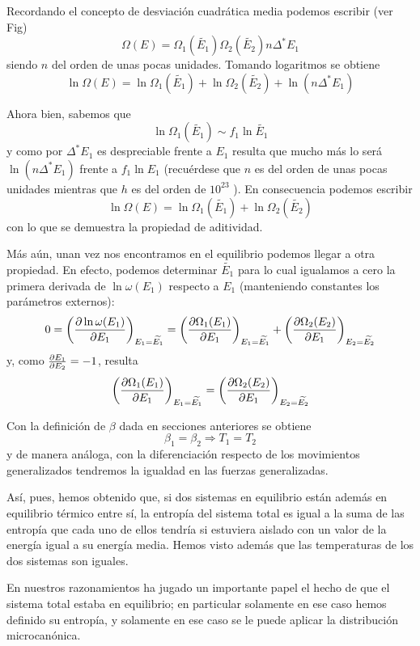 Recordando el concepto de desviación cuadrática media podemos escribir (ver Fig)
$$\Omega(E) = \Omega_1(\widetilde{E_1}) \Omega_2(\widetilde{E_2})n\Delta^*E_1$$
siendo $n$ del orden de unas pocas unidades.
Tomando logaritmos se obtiene
\begin{equation}
	\ln \Omega(E) = \ln \Omega_1(\widetilde{E_1})  + \ln \Omega_2(\widetilde{E_2}) + \ln(n\Delta^*E_1)
\end{equation}

Ahora bien, sabemos que 
$$\ln \Omega_1(\widetilde{E_1}) \sim f_1\ln \widetilde{E_1}$$
y como por $\Delta^*E_1$ es despreciable frente a $E_1$ resulta que mucho más lo será $\ln (n\Delta^*E_1)$ frente a $f_1 \ln E_1$ (recuérdese que $n$ es del orden de unas pocas unidades mientras que $h$ es del orden de $10^{23}$ ).
En consecuencia podemos escribir
\begin{equation}
	\ln \Omega(E) = \ln \Omega_1(\widetilde{E_1})  + \ln \Omega_2(\widetilde{E_2})
\end{equation}
con lo que se demuestra la propiedad de aditividad.

Más aún, unan vez nos encontramos en el equilibrio podemos llegar a otra propiedad. En efecto, podemos determinar $\widetilde{E_1}$ para lo cual igualamos a cero la primera derivada de $\ln \omega(E_1)$ respecto a $E_1$ (manteniendo constantes los parámetros externos):
$$0 = \left( \pdv{\ln \omega(E_1)}{E_1}\right)_{E_1 = \widetilde{E_1}}  = \left( \pdv{\Omega_1(E_1)}{E_1} \right)_{E_1 = \widetilde{E_1}} + \left( \pdv{\Omega_2(E_2)}{E_1} \right)_{E_2 = \widetilde{E_2}}$$
y, como $\pdv{E_1}{E_2} = -1 $, resulta
\begin{equation}
	\left( \pdv{\Omega_1(E_1)}{E_1}\right)_{E_1 = \widetilde{E_1}} = \left(  \pdv{\Omega_2(E_2)}{E_1}\right)_{E_2 = \widetilde{E_2}}
\end{equation}

Con la definición de $\beta$ dada en secciones anteriores se obtiene
\begin{equation}
	\beta_1 = \beta_2 \Rightarrow \boxed{T_1 = T_2}
\end{equation}
y de manera análoga, con la diferenciación respecto de los movimientos generalizados tendremos la igualdad en las fuerzas generalizadas.

Así, pues, hemos obtenido que, si dos sistemas en equilibrio están además en equilibrio térmico entre sí, la entropía del sistema total es igual a la suma de las entropía que cada uno de ellos tendría si estuviera aislado con un valor de la energía igual a su energía media.
Hemos visto además que las temperaturas de los dos sistemas son iguales.

En nuestros razonamientos ha jugado un importante papel el hecho de que el sistema total estaba en equilibrio; en particular solamente en ese caso hemos definido su entropía, y solamente en ese caso se le puede aplicar la distribución microcanónica.



